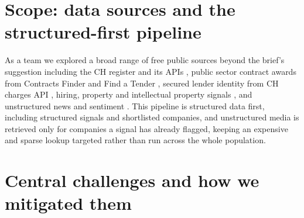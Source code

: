 \documentclass[    author={Samuel Menon Demelo; Sneha Saphala Ram Prasad; 
Viktor Ander Lindholm; Vishal Khatri},
               supervisor={Prof. Fernando Moreno-Pino},
                   degree={MSc},
                    title={Lloyds Commercial Banking Intelligence},
                 subtitle={Ranking SME Lending, Risk and Growth Prospects for Lloyds Banking Group},
                     type={},
                     year={2026}]{dissertation}
\begin{document}
\section {Scope: data sources and the structured-first pipeline}
As a team we explored a broad range of free public sources beyond the brief's suggestion including the CH register and its APIs \cite{companieshouse_api}, public sector contract awards from Contracts Finder and Find a Tender \cite{contractsfinder,findatender,ocds}, secured lender identity from CH charges API \cite{companieshouse_api}, hiring, property and intellectual property signals \cite{adzuna_api, landregistry_ccod,ukipo_tm}, and unstructured news and sentiment \cite{gdelt, newsapi,guardian_api,gnews_api}. This pipeline is structured data first, including structured signals and shortlisted companies, and unstructured media is retrieved only for companies a signal has already flagged, keeping an expensive and sparse lookup targeted rather than run across the whole population.

\section{Central challenges and how we mitigated them}
\end{document}
